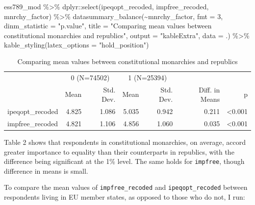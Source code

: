 \documentclass[
]{article}
\newenvironment{Shaded}{\begin{snugshade}}{\end{snugshade}}
\newcommand{\AttributeTok}[1]{\textcolor[rgb]{0.77,0.63,0.00}{#1}}
\newcommand{\DecValTok}[1]{\textcolor[rgb]{0.00,0.00,0.81}{#1}}
\newcommand{\FunctionTok}[1]{\textcolor[rgb]{0.00,0.00,0.00}{#1}}
\newcommand{\NormalTok}[1]{#1}
\newcommand{\SpecialCharTok}[1]{\textcolor[rgb]{0.00,0.00,0.00}{#1}}
\newcommand{\StringTok}[1]{\textcolor[rgb]{0.31,0.60,0.02}{#1}}
\begin{document}
\begin{Shaded}
\begin{Highlighting}[]
\NormalTok{ess789\_mod }\SpecialCharTok{\%\textgreater{}\%}
\NormalTok{ dplyr}\SpecialCharTok{::}\FunctionTok{select}\NormalTok{(ipeqopt\_recoded, impfree\_recoded, mnrchy\_factor) }\SpecialCharTok{\%\textgreater{}\%}
 \FunctionTok{datasummary\_balance}\NormalTok{(}\SpecialCharTok{\textasciitilde{}}\NormalTok{mnrchy\_factor, }\AttributeTok{fmt =} \DecValTok{3}\NormalTok{,}
                     \AttributeTok{dinm\_statistic =} \StringTok{"p.value"}\NormalTok{,}
                     \AttributeTok{title =} \StringTok{"Comparing mean values between constitutional monarchies and republics"}\NormalTok{,}
                     \AttributeTok{output =} \StringTok{"kableExtra"}\NormalTok{,}
                     \AttributeTok{data =}\NormalTok{ .) }\SpecialCharTok{\%\textgreater{}\%}
  \FunctionTok{kable\_styling}\NormalTok{(}\AttributeTok{latex\_options =} \StringTok{"hold\_position"}\NormalTok{)}
\end{Highlighting}
\end{Shaded}

\begin{table}[!h]

\caption{\label{tab:mean-equal-free-monarchy}Comparing mean values between constitutional monarchies and republics}
\centering
\begin{tabular}[t]{lrrrrrr}
\toprule
\multicolumn{1}{c}{ } & \multicolumn{2}{c}{0 (N=74502)} & \multicolumn{2}{c}{1 (N=25394)} & \multicolumn{2}{c}{ } \\
\cmidrule(l{3pt}r{3pt}){2-3} \cmidrule(l{3pt}r{3pt}){4-5}
  & Mean & Std. Dev. & Mean & Std. Dev. & Diff. in Means & p\\
\midrule
ipeqopt\_recoded & 4.825 & 1.086 & 5.035 & 0.942 & 0.211 & <0.001\\
impfree\_recoded & 4.821 & 1.106 & 4.856 & 1.060 & 0.035 & <0.001\\
\bottomrule
\end{tabular}
\end{table}

Table 2 shows that respondents in constitutional monarchies, on average,
accord greater importance to equality than their counterparts in
republics, with the difference being significant at the 1\% level. The
same holds for \texttt{impfree}, though difference in means is small.

To compare the mean values of \texttt{impfree\_recoded} and
\texttt{ipeqopt\_recoded} between respondents living in EU member
states, as opposed to those who do not, I run:
\end{document}
